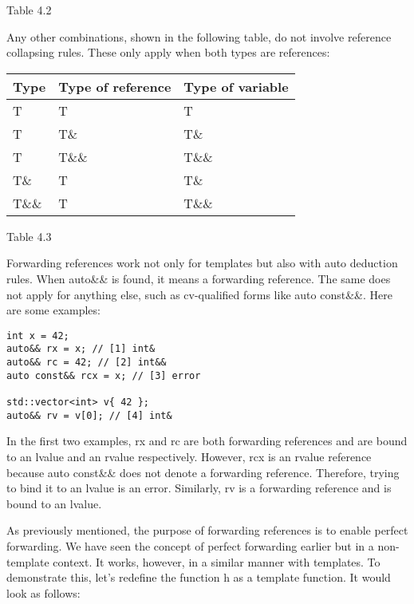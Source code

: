 \begin{center}
Table 4.2
\end{center}

Any other combinations, shown in the following table, do not involve reference collapsing rules. These only apply when both types are references:

\begin{table}[H]
\centering
	\begin{tabular}{|l|l|l|}
		\hline
		\textbf{Type} & \textbf{Type of reference} & \textbf{Type of variable} \\ \hline
		T             & T                          & T                         \\ \hline
		T             & T\&                        & T\&                       \\ \hline
		T             & T\&\&                      & T\&\&                     \\ \hline
		T\&           & T                          & T\&                       \\ \hline
		T\&\&         & T                          & T\&\&                     \\ \hline
	\end{tabular}
\end{table}

\begin{center}
	Table 4.3
\end{center}

Forwarding references work not only for templates but also with auto deduction rules. When auto\&\& is found, it means a forwarding reference. The same does not apply for anything else, such as cv-qualified forms like auto const\&\&. Here are some examples:

\begin{lstlisting}[style=styleCXX]
int x = 42;
auto&& rx = x; // [1] int&
auto&& rc = 42; // [2] int&&
auto const&& rcx = x; // [3] error

std::vector<int> v{ 42 };
auto&& rv = v[0]; // [4] int&
\end{lstlisting}

In the first two examples, rx and rc are both forwarding references and are bound to an lvalue and an rvalue respectively. However, rcx is an rvalue reference because auto const\&\& does not denote a forwarding reference. Therefore, trying to bind it to an lvalue is an error. Similarly, rv is a forwarding reference and is bound to an lvalue.

As previously mentioned, the purpose of forwarding references is to enable perfect forwarding. We have seen the concept of perfect forwarding earlier but in a non-template context. It works, however, in a similar manner with templates. To demonstrate this, let’s redefine the function h as a template function. It would look as follows:

